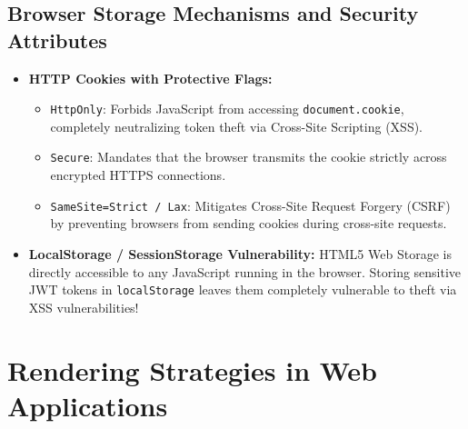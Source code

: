 \subsection{Browser Storage Mechanisms and Security Attributes}
\begin{itemize}
    \item \textbf{HTTP Cookies with Protective Flags:}
    \begin{itemize}
        \item \texttt{HttpOnly}: Forbids JavaScript from accessing \texttt{document.cookie}, completely neutralizing token theft via Cross-Site Scripting (XSS).
        \item \texttt{Secure}: Mandates that the browser transmits the cookie strictly across encrypted HTTPS connections.
        \item \texttt{SameSite=Strict / Lax}: Mitigates Cross-Site Request Forgery (CSRF) by preventing browsers from sending cookies during cross-site requests.
    \end{itemize}
    \item \textbf{LocalStorage / SessionStorage Vulnerability:} HTML5 Web Storage is directly accessible to any JavaScript running in the browser. Storing sensitive JWT tokens in \texttt{localStorage} leaves them completely vulnerable to theft via XSS vulnerabilities!
\end{itemize}

\section{Rendering Strategies in Web Applications}
\label{sec:se_rendering_strategies}

